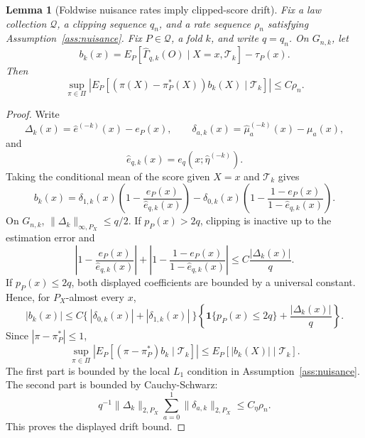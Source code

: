 \documentclass[11pt]{article}
\newcommand{\one}{\mathbf{1}}
\theoremstyle{definition}
\theoremstyle{plain}
\newtheorem{lemma}{Lemma}
\theoremstyle{remark}
\begin{document}
\begin{lemma}[Foldwise nuisance rates imply clipped-score drift]\label{lem:drift-derived}
Fix a law collection \(\mathcal Q\), a clipping sequence \(q_n\), and a rate
sequence \(\rho_n\) satisfying Assumption~\ref{ass:nuisance}.  Fix
\(P\in\mathcal Q\), a fold \(k\), and write \(q=q_n\).  On \(G_{n,k}\), let
\[
b_k(x)=E_P[\widehat\Gamma_{q,k}(O)\mid X=x,\mathcal T_k]-\tau_P(x).
\]
Then
\[
\sup_{\pi\in\Pi}
\left|E_P[(\pi(X)-\pi_P^*(X))b_k(X)\mid\mathcal T_k]\right|
\le C\rho_n.
\]
\end{lemma}
\begin{proof}
Write
\[
\Delta_k(x)=\widehat e^{(-k)}(x)-e_P(x),\qquad
\delta_{a,k}(x)=\widehat\mu_a^{(-k)}(x)-\mu_a(x),
\]
and
\[
\widehat e_{q,k}(x)=e_q(x;\widehat\eta^{(-k)}).
\]
Taking the conditional mean of the score given \(X=x\) and \(\mathcal T_k\)
gives
\[
b_k(x)
=
\delta_{1,k}(x)\left(1-\frac{e_P(x)}{\widehat e_{q,k}(x)}\right)
-\delta_{0,k}(x)\left(1-\frac{1-e_P(x)}{1-\widehat e_{q,k}(x)}\right).
\]
On \(G_{n,k}\), \(\|\Delta_k\|_{\infty,P_X}\le q/2\).  If
\(p_P(x)>2q\), clipping is inactive up to the estimation error and
\[
\left|1-\frac{e_P(x)}{\widehat e_{q,k}(x)}\right|
+
\left|1-\frac{1-e_P(x)}{1-\widehat e_{q,k}(x)}\right|
\le C\frac{|\Delta_k(x)|}{q}.
\]
If \(p_P(x)\le2q\), both displayed coefficients are bounded by a universal
constant.  Hence, for \(P_X\)-almost every \(x\),
\[
|b_k(x)|
\le
C\{\ |\delta_{0,k}(x)|+|\delta_{1,k}(x)|\ \}
\left\{\one\{p_P(x)\le2q\}+\frac{|\Delta_k(x)|}{q}\right\}.
\]
Since \(|\pi-\pi_P^*|\le1\),
\[
\sup_{\pi\in\Pi}
\left|E_P[(\pi-\pi_P^*)b_k\mid\mathcal T_k]\right|
\le E_P[|b_k(X)|\mid\mathcal T_k].
\]
The first part is bounded by the local \(L_1\) condition in
Assumption~\ref{ass:nuisance}.  The second part is bounded by Cauchy-Schwarz:
\[
q^{-1}
\|\Delta_k\|_{2,P_X}
\sum_{a=0}^1\|\delta_{a,k}\|_{2,P_X}
\le C_\eta\rho_n.
\]
This proves the displayed drift bound.
\end{proof}
\end{document}
